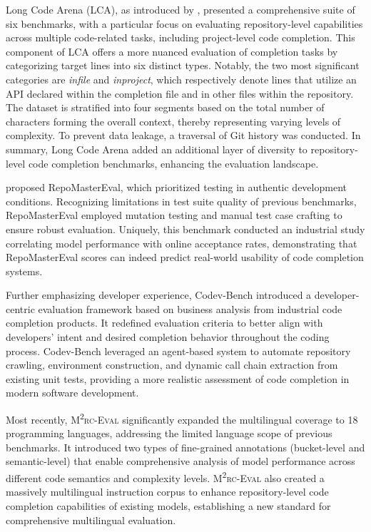 Long Code Arena (LCA), as introduced by \citet{bogomolov2024}, presented a comprehensive suite of six benchmarks, with a particular focus on evaluating repository-level capabilities across multiple code-related tasks, including project-level code completion. This component of LCA offers a more nuanced evaluation of completion tasks by categorizing target lines into six distinct types. Notably, the two most significant categories are \textit{infile} and \textit{inproject}, which respectively denote lines that utilize an API declared within the completion file and in other files within the repository. The dataset is stratified into four segments based on the total number of characters forming the overall context, thereby representing varying levels of complexity. To prevent data leakage, a traversal of Git history was conducted. In summary, Long Code Arena added an additional layer of diversity to repository-level code completion benchmarks, enhancing the evaluation landscape.

\citet{wu2024b} proposed RepoMasterEval, which prioritized testing in authentic development conditions. Recognizing limitations in test suite quality of previous benchmarks, RepoMasterEval employed mutation testing and manual test case crafting to ensure robust evaluation. Uniquely, this benchmark conducted an industrial study correlating model performance with online acceptance rates, demonstrating that RepoMasterEval scores can indeed predict real-world usability of code completion systems.

Further emphasizing developer experience, Codev-Bench \parencite{pan2024} introduced a developer-centric evaluation framework based on business analysis from industrial code completion products. It redefined evaluation criteria to better align with developers' intent and desired completion behavior throughout the coding process. Codev-Bench leveraged an agent-based system to automate repository crawling, environment construction, and dynamic call chain extraction from existing unit tests, providing a more realistic assessment of code completion in modern software development.

Most recently, \textsc{M\textsuperscript{2}rc-Eval} \parencite{liu2024} significantly expanded the multilingual coverage to 18 programming languages, addressing the limited language scope of previous benchmarks. It introduced two types of fine-grained annotations (bucket-level and semantic-level) that enable comprehensive analysis of model performance across different code semantics and complexity levels. \textsc{M\textsuperscript{2}rc-Eval} also created a massively multilingual instruction corpus to enhance repository-level code completion capabilities of existing models, establishing a new standard for comprehensive multilingual evaluation.

